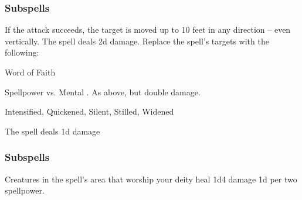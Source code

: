 \subsubsection{Subspells}
If the attack succeeds, the target is moved up to 10 feet in any direction -- even vertically.
The spell deals \minus2d damage.
Replace the spell's targets with the following:
\begin{spellcontent}
\begin{augmenttargetinginfo}
\end{augmenttargetinginfo}
\end{spellcontent}
\begin{spellsection}{Word of Faith}
\begin{spellheader}
\end{spellheader}
\begin{spellcontent}
\begin{spelltargetinginfo}
\end{spelltargetinginfo}
\begin{spelleffects}
\begin{spellattack}{Spellpower vs. Mental}
\spellsuccess {}.
\spellcritical As above, but double damage.
\end{spellattack}
\end{spelleffects}
\end{spellcontent}
\begin{spellfooter}
 Intensified, Quickened, Silent, Stilled, Widened
\end{spellfooter}
\begin{spellsubcontent}
\begin{spellcantrip}
The spell deals \minus1d damage
\end{spellcantrip}
\end{spellsubcontent}
\end{spellsection}
\subsubsection{Subspells}
Creatures in the spell's area that worship your deity heal 1d4 damage \plus1d per two spellpower.